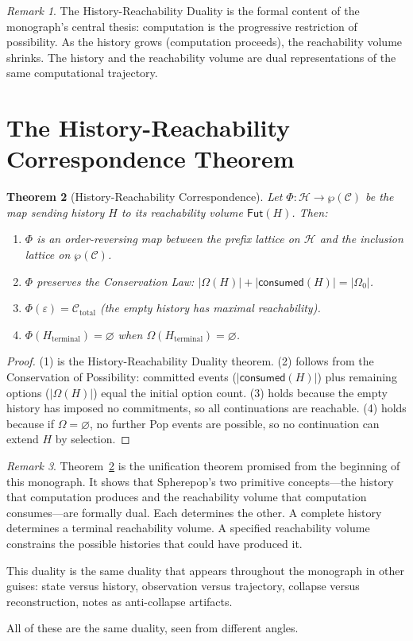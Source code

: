 \documentclass[12pt, a4paper, openany]{book}
\theoremstyle{plain}
\newtheorem{theorem}{Theorem}[chapter]
\theoremstyle{definition}
\theoremstyle{remark}
\newtheorem{remark}[theorem]{Remark}
\newcommand{\calH}{\mathcal{H}}
\newcommand{\calC}{\mathcal{C}}
\begin{document}
\begin{remark}
The History-Reachability Duality is the formal content of the monograph's
central thesis: computation is the progressive restriction of possibility.
As the history grows (computation proceeds), the reachability volume shrinks.
The history and the reachability volume are dual representations of the
same computational trajectory.
\end{remark}

\section{The History-Reachability Correspondence Theorem}

\begin{theorem}[History-Reachability Correspondence]
\label{thm:hrc}
Let $\Phi : \calH \to \wp(\calC)$ be the map sending history $H$ to its
reachability volume $\mathsf{Fut}(H)$. Then:
\begin{enumerate}
\item $\Phi$ is an order-reversing map between the prefix lattice on $\calH$
and the inclusion lattice on $\wp(\calC)$.
\item $\Phi$ preserves the Conservation Law: $|\Omega(H)| + |\mathsf{consumed}(H)| = |\Omega_0|$.
\item $\Phi(\varepsilon) = \calC_{\mathrm{total}}$ (the empty history has maximal reachability).
\item $\Phi(H_{\mathrm{terminal}}) = \varnothing$ when $\Omega(H_{\mathrm{terminal}}) = \varnothing$.
\end{enumerate}
\end{theorem}

\begin{proof}
(1) is the History-Reachability Duality theorem. (2) follows from the Conservation
of Possibility: committed events ($|\mathsf{consumed}(H)|$) plus remaining
options ($|\Omega(H)|$) equal the initial option count. (3) holds because the
empty history has imposed no commitments, so all continuations are reachable.
(4) holds because if $\Omega = \varnothing$, no further Pop events are possible,
so no continuation can extend $H$ by selection.
\end{proof}

\begin{remark}
Theorem~\ref{thm:hrc} is the unification theorem promised from the beginning of
this monograph. It shows that Spherepop's two primitive concepts---the history
that computation produces and the reachability volume that computation consumes---are
formally dual. Each determines the other. A complete history determines a
terminal reachability volume. A specified reachability volume constrains the
possible histories that could have produced it.

This duality is the same duality that appears throughout the monograph in
other guises: state versus history, observation versus trajectory, collapse
versus reconstruction, notes as anti-collapse artifacts.

All of these are the same duality, seen from different angles.
\end{remark}
\end{document}
